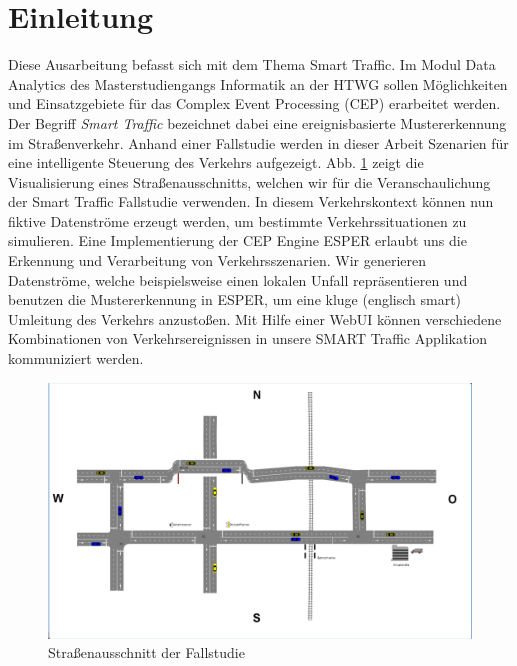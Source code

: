 \section{Einleitung}

Diese Ausarbeitung befasst sich mit dem Thema Smart Traffic. Im Modul Data Analytics des Masterstudiengangs Informatik an der HTWG sollen Möglichkeiten und Einsatzgebiete für das Complex Event Processing (CEP)  erarbeitet werden. Der Begriff \emph{Smart Traffic} bezeichnet dabei eine ereignisbasierte Mustererkennung im Straßenverkehr. Anhand einer Fallstudie werden in dieser Arbeit Szenarien für eine intelligente Steuerung des Verkehrs aufgezeigt. Abb. \ref{fig1} zeigt die Visualisierung  eines Straßenausschnitts, welchen wir für die Veranschaulichung der Smart Traffic Fallstudie verwenden. In diesem Verkehrskontext können nun fiktive Datenströme erzeugt werden, um bestimmte Verkehrssituationen zu simulieren. Eine Implementierung der CEP Engine ESPER erlaubt uns die Erkennung und Verarbeitung von Verkehrsszenarien. Wir generieren Datenströme, welche beispielsweise einen lokalen Unfall  repräsentieren und benutzen die Mustererkennung in ESPER, um eine kluge (englisch smart) Umleitung des Verkehrs anzustoßen. Mit Hilfe einer WebUI können verschiedene Kombinationen von Verkehrsereignissen in unsere SMART Traffic Applikation kommuniziert werden.

\begin{figure}[ht]
	\includegraphics[width=\textwidth]{images/1_InitialStreetMap_Final.png}
	\caption{Straßenausschnitt der Fallstudie}
	\label{fig1}
\end{figure}




